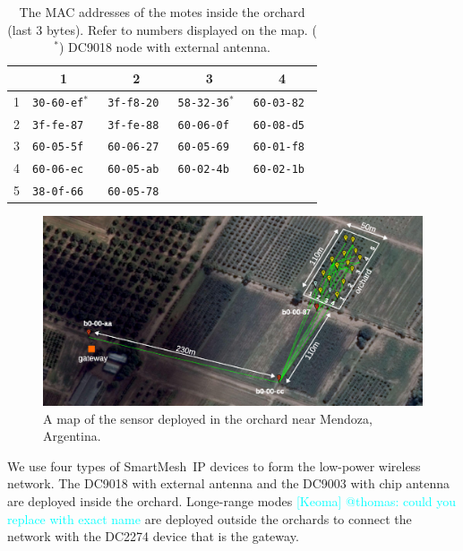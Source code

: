 \documentclass{sig-alternate}
\newcommand{\keoma}[1]              {\textcolor{cyan}{[Keoma] #1}}
\newcommand{\smip}                  {SmartMesh~IP\xspace}
\begin{document}
\begin{table}
\begin{center}
    \begin{tabular}{ | l | l | l | l | l |}
         \hline
           & \multicolumn{1}{|c|}{1} & \multicolumn{1}{|c|}{2} & \multicolumn{1}{|c|}{3} & \multicolumn{1}{|c|}{4}\\
         \hline
         1 & \tt{30-60-ef}$^*$ & \tt{3f-f8-20} & \tt{58-32-36}$^*$ & \tt{60-03-82} \\
         2 & \tt{3f-fe-87}     & \tt{3f-fe-88} & \tt{60-06-0f}     & \tt{60-08-d5} \\
         3 & \tt{60-05-5f}     & \tt{60-06-27} & \tt{60-05-69}     & \tt{60-01-f8} \\
         4 & \tt{60-06-ec}     & \tt{60-05-ab} & \tt{60-02-4b}     & \tt{60-02-1b} \\
         5 & \tt{38-0f-66}     & \tt{60-05-78} &                   &               \\
         \hline
    \end{tabular}
    \caption{The MAC addresses of the motes inside the orchard (last 3 bytes). Refer to numbers displayed on the map. ($^*$) DC9018 node with external antenna.}
\end{center}
\end{table}

\begin{figure}
    \centering
    \includegraphics[width=\textwidth]{map_annotated}
    \caption{A map of the sensor deployed in the orchard near Mendoza, Argentina.}
    \label{fig:map}
\end{figure}


We use four types of \smip devices to form the low-power wireless network.
The DC9018 with external antenna and the DC9003 with chip antenna are deployed inside the orchard.
Longe-range modes \keoma{@thomas: could you replace with exact name} are deployed outside the orchards to connect the network with the DC2274 device that is the gateway.
\end{document}
